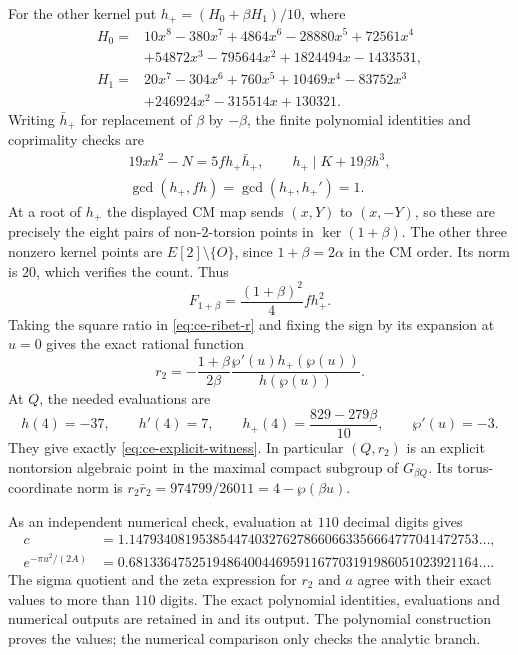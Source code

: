 For the other kernel put $h_+=(H_0+\beta H_1)/10$, where
\[
 \begin{aligned}
 H_0={}&10x^8-380x^7+4864x^6-28880x^5+72561x^4\\
       &+54872x^3-795644x^2+1824494x-1433531,\\
 H_1={}&20x^7-304x^6+760x^5+10469x^4-83752x^3\\
       &+246924x^2-315514x+130321.
 \end{aligned}
\]
Writing $\bar h_+$ for replacement of $\beta$ by $-\beta$,
the finite polynomial identities and coprimality checks are
\[
 \begin{gathered}
 19xh^2-N=5f h_+\bar h_+,\qquad
 h_+\mid K+19\beta h^3,\\
 \gcd(h_+,fh)=\gcd(h_+,h_+')=1.
 \end{gathered}
\]
At a root of $h_+$ the displayed CM map sends $(x,Y)$ to
$(x,-Y)$, so these are precisely the eight pairs of
non-$2$-torsion points in $\ker(1+\beta)$. The other three
nonzero kernel points are $E[2]\setminus\{O\}$, since
$1+\beta=2\alpha$ in the CM order. Its norm is $20$,
which verifies the count. Thus
\[
 F_{1+\beta}=\frac{(1+\beta)^2}{4}f h_+^2.
\]
Taking the square ratio in \eqref{eq:ce-ribet-r} and fixing
the sign by its expansion at $u=0$ gives the exact rational
function
\[
 r_2=-\frac{1+\beta}{2\beta}\frac{\wp'(u)h_+(\wp(u))}
                                             {h(\wp(u))}.
\]
At $Q$, the needed evaluations are
\[
 h(4)=-37,\qquad h'(4)=7,\qquad
 h_+(4)=\frac{829-279\beta}{10},\qquad\wp'(u)=-3.
\]
They give exactly \eqref{eq:ce-explicit-witness}. In
particular $(Q,r_2)$ is an explicit nontorsion algebraic
point in the maximal compact subgroup of $G_{\beta Q}$.
Its torus-coordinate norm is
$r_2\bar r_2=974799/26011=4-\wp(\beta u)$.

As an independent numerical check, evaluation at $110$
decimal digits gives
\[
 \begin{aligned}
 c&=1.14793408195385447403276278660663356664777041472753\ldots,\\
 e^{-\pi u^2/(2A)}
  &=0.68133647525194864004469591167703191986051023921164\ldots.
 \end{aligned}
\]
The sigma quotient and the zeta expression for $r_2$ and $a$
agree with their exact values to more than $110$ digits.
The exact polynomial identities, evaluations and numerical
outputs are retained in  and
its output. The polynomial construction proves the values;
the numerical comparison only checks the analytic branch.
